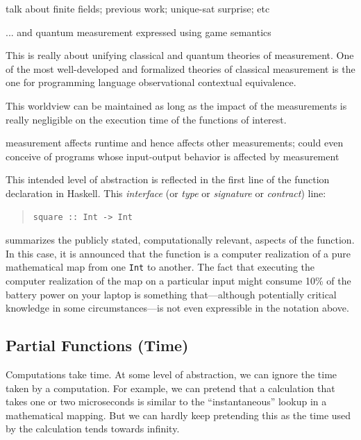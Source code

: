\documentclass{article}
\theoremstyle{remark}
\begin{document}
talk about finite fields; previous work; unique-sat surprise; etc

... and quantum measurement expressed using game semantics
 
This is really about unifying classical and quantum theories of
measurement. One of the most well-developed and formalized theories of
classical measurement is the one for programming language
observational contextual equivalence.


This worldview can be maintained as long as the impact of the
measurements is really negligible on the execution time of the
functions of interest.

measurement affects runtime and hence affects other measurements;
could even conceive of programs whose input-output behavior is
affected by measurement

This intended level of abstraction is reflected in the first
line of the function declaration in Haskell. This \emph{interface} (or \emph{type}
or \emph{signature} or \emph{contract}) line:
\begin{quote}
\begin{verbatim}
square :: Int -> Int
\end{verbatim}
\end{quote}
summarizes the publicly stated, computationally relevant, aspects of the
function. In this case, it is announced that the function is a computer
realization of a pure mathematical map from one \verb|Int| to another. The
fact that executing the computer realization of the map on a particular input
might consume 10\% of the battery power on your laptop is something
that---although potentially critical knowledge in some circumstances---is not
even expressible in the notation above. 

\subsection*{Partial Functions (Time)}

Computations take time. At some level of abstraction, we can ignore the time
taken by a computation. For example, we can pretend that a calculation that
takes one or two microseconds is similar to the ``instantaneous'' lookup in a
mathematical mapping. But we can hardly keep pretending this as the time used
by the calculation tends towards infinity.
\end{document}

